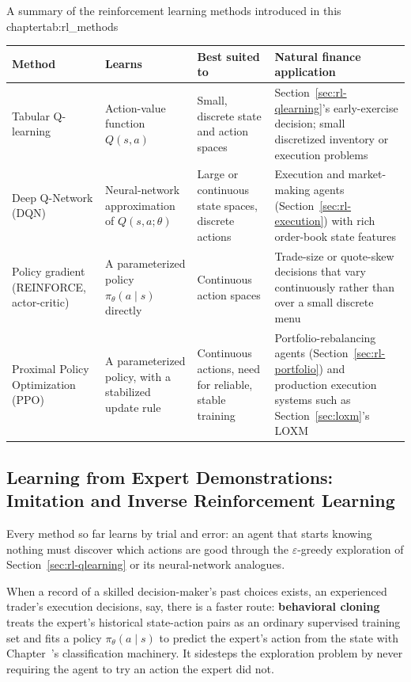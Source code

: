 \documentclass[../ai_in_finance]{subfiles}
\begin{document}
\begin{booktable}[htbp]{A summary of the reinforcement learning methods introduced in this chapter}{tab:rl_methods}
\begin{tabular}{L{2.6cm}L{2.3cm}L{2.3cm}L{6.3cm}}
\toprule
Method & Learns & Best suited to & Natural finance application \\
\midrule
Tabular Q-learning & Action-value function $Q(s,a)$ & Small, discrete state and action spaces & Section~\ref{sec:rl-qlearning}'s early-exercise decision; small discretized inventory or execution problems \\
Deep Q-Network (DQN) & Neural-network approximation of $Q(s,a;\theta)$ & Large or continuous state spaces, discrete actions & Execution and market-making agents (Section~\ref{sec:rl-execution}) with rich order-book state features \\
Policy gradient (REINFORCE, actor-critic) & A parameterized policy $\pi_\theta(a\mid s)$ directly & Continuous action spaces & Trade-size or quote-skew decisions that vary continuously rather than over a small discrete menu \\
Proximal Policy Optimization (PPO) & A parameterized policy, with a stabilized update rule & Continuous actions, need for reliable, stable training & Portfolio-rebalancing agents (Section~\ref{sec:rl-portfolio}) and production execution systems such as Section~\ref{sec:loxm}'s LOXM \\
\bottomrule
\end{tabular}
\end{booktable}

\subsection{Learning from Expert Demonstrations: Imitation and Inverse Reinforcement Learning}
\label{sec:imitation}

Every method so far learns by trial and error: an agent that starts knowing nothing must discover which actions are good through the $\varepsilon$-greedy exploration of Section~\ref{sec:rl-qlearning} or its neural-network analogues.

When a record of a skilled decision-maker's past choices exists, an experienced trader's execution decisions, say, there is a faster route: \textbf{behavioral cloning} treats the expert's historical state-action pairs as an ordinary supervised training set and fits a policy $\pi_\theta(a\mid s)$ to predict the expert's action from the state with Chapter~'s classification machinery. It sidesteps the exploration problem by never requiring the agent to try an action the expert did not.
\end{document}
